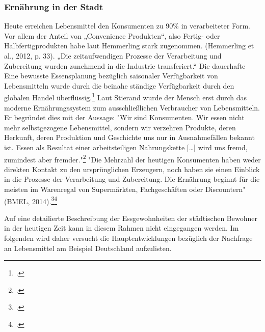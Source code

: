\documentclass{scrartcl}
\begin{document}
\subsubsection {Ernährung in der Stadt}
Heute erreichen Lebensmittel den Konsumenten zu 90\% in verarbeiteter Form. Vor allem der Anteil von „Convenience Produkten“, also Fertig- oder Halbfertigprodukten habe laut Hemmerling stark zugenommen. (Hemmerling et al., 2012, p. 33). „Die zeitaufwendigen Prozesse der Verarbeitung und Zubereitung wurden zunehmend in die Industrie transferiert.“  
Die dauerhafte Eine bewusste Essensplanung bezüglich saisonaler Verfügbarkeit von Lebensmitteln wurde durch die beinahe ständige Verfügbarkeit durch den globalen Handel überflüssig.\footcite[Vgl.][S.20]{SchmidtDieVon}
Laut Stierand wurde der Mensch erst durch das moderne Ernährungssystem zum ausschließlichen Verbraucher von Lebensmitteln. Er begründet dies mit der Aussage: "Wir sind Konsumenten. Wir essen nicht mehr selbstgezogene Lebensmittel, sondern wir verzehren Produkte, deren Herkunft, deren Produktion und Geschichte uns nur in Ausnahmefällen bekannt ist. Essen als Resultat einer arbeitsteiligen Nahrungskette […] wird uns fremd, zumindest aber fremder."\footcite{Spiekermann2000GesundeKulturwissenschaft} 
"Die Mehrzahl der heutigen Konsumenten haben weder direkten Kontakt zu den ursprünglichen Erzeugern, noch haben sie einen Einblick in die Prozesse der Verarbeitung und Zubereitung.
Die Ernährung beginnt für die meisten im Warenregal von Supermärkten, Fachgeschäften oder Discountern" (BMEL, 2014).\footcite[S.20]{SchmidtDieVon}\footcite[Vgl.]{BerichtInhalt}

 Auf eine detailierte Beschreibung der Essgewohnheiten der städtischen Bewohner in der heutigen Zeit kann in diesem Rahmen nicht eingegangen werden. Im folgenden wird daher versucht die Hauptentwicklungen bezüglich der Nachfrage an Lebensmittel am Beispiel Deutschland aufzulisten. 
 
\end{document}
